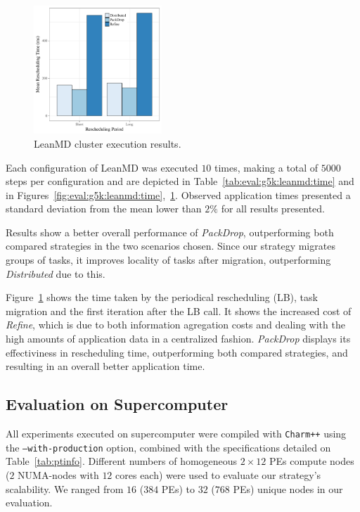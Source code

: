 \begin{figure}[!t]
	\centering
    \includegraphics[width=0.43\textwidth]{images/schedtime_leanmd_g5k.pdf}
	\caption{LeanMD cluster execution results.}
    \label{fig:eval:g5k:leanmd:schedtime}
\end{figure}

Each configuration of LeanMD was executed $10$ times, making a total of $5000$ steps per configuration and are depicted in Table~\ref{tab:eval:g5k:leanmd:time} and in Figures~\ref{fig:eval:g5k:leanmd:time},~\ref{fig:eval:g5k:leanmd:schedtime}.
Observed application times presented a standard deviation from the mean lower than $2\%$ for all results presented.

Results show a better overall performance of \textit{PackDrop}, outperforming both compared strategies in the two scenarios chosen.
Since our strategy migrates groups of tasks, it improves locality of tasks after migration, outperforming \textit{Distributed} due to this.

Figure~\ref{fig:eval:g5k:leanmd:schedtime} shows the time taken by the periodical rescheduling (LB), task migration and the first iteration after the LB call.
It shows the increased cost of \textit{Refine}, which is due to both information agregation costs and dealing with the high amounts of application data in a centralized fashion.
\textit{PackDrop} displays its effectiviness in rescheduling time, outperforming both compared strategies, and resulting in an overall better application time. 

\subsection{Evaluation on Supercomputer} \label{sec:sdumont}

All experiments executed on supercomputer were compiled with \texttt{Charm++} using the \texttt{--with-production} option, combined with the specifications detailed on Table~\ref{tab:ptinfo}.
Different numbers of homogeneous $2\times 12$ PEs compute nodes ($2$ NUMA-nodes with $12$ cores each) were used to evaluate our strategy's scalability.
We ranged from $16$ ($384$ PEs) to $32$ ($768$ PEs) unique nodes in our evaluation. 

